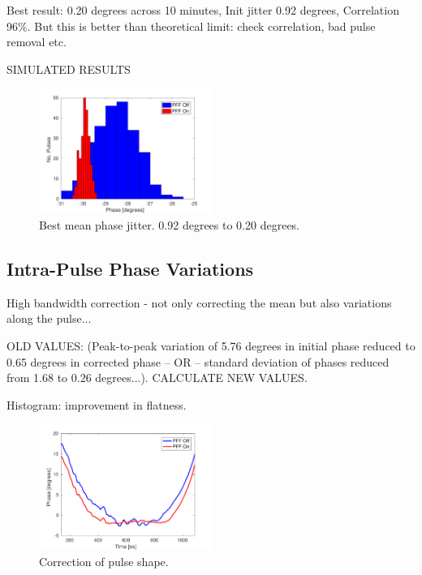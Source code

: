 \documentclass[%
 reprint,
 amsmath,amssymb,
 aps,
]{revtex4-1}
\begin{document}
Best result:
0.20 degrees across 10 minutes,
Init jitter 0.92 degrees,
Correlation 96\%.
But this is better than theoretical limit: check correlation, bad pulse 
removal etc.

SIMULATED RESULTS

\begin{figure}
\includegraphics[width=0.5\textwidth]{figs/BestFF_meanJit}%
\caption{\label{fig:meanJit}Best mean phase jitter. 0.92 degrees to 0.20 
degrees.}
\end{figure}


\subsection{\label{ss:shape}Intra-Pulse Phase Variations}

High bandwidth correction - not only correcting the mean but also variations along the pulse...

OLD VALUES: (Peak-to-peak variation of 5.76 degrees in initial phase reduced to 
0.65 degrees in corrected phase -- OR -- standard deviation of phases reduced 
from 1.68 to 0.26 degrees...). CALCULATE NEW VALUES.

Histogram: improvement in flatness.

\begin{figure}
\includegraphics[width=0.5\textwidth]{figs/BestFF_shape}%
\caption{\label{fig:shape}Correction of pulse shape.}
\end{figure}
\end{document}
